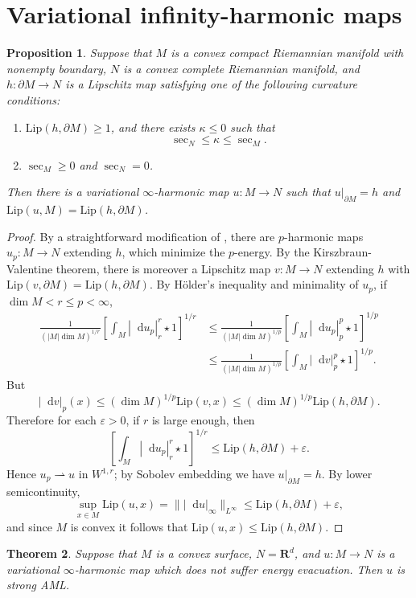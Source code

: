\documentclass[reqno,11pt]{amsart}
\newcommand{\RR}{\mathbf{R}}
\newcommand*\dif{\mathop{}\!\mathrm{d}}
\newcommand{\Lip}{\mathrm{Lip}}
\newtheorem{theorem}{Theorem}[section]
\newtheorem{proposition}[theorem]{Proposition}
\newcommand{\weakto}{\rightharpoonup}
\theoremstyle{definition}
\numberwithin{equation}{section}
\begin{document}
\section{Variational infinity-harmonic maps}
\begin{proposition}
Suppose that $M$ is a convex compact Riemannian manifold with nonempty boundary, $N$ is a convex complete Riemannian manifold, and $h: \partial M \to N$ is a Lipschitz map satisfying one of the following curvature conditions:
\begin{enumerate}
\item $\Lip(h, \partial M) \geq 1$, and there exists $\kappa \leq 0$ such that 
$$\sec_N \leq \kappa \leq \sec_M.$$
\item $\sec_M \geq 0$ and $\sec_N = 0$.
\end{enumerate}
Then there is a variational $\infty$-harmonic map $u: M \to N$ such that $u|_{\partial M} = h$ and $\Lip(u, M) = \Lip(h, \partial M)$.
\end{proposition}
\begin{proof}
By a straightforward modification of \cite[Theorem 2.12]{daskalopoulos2022analytic}, there are $p$-harmonic maps $u_p: M \to N$ extending $h$, which minimize the $p$-energy.
By the Kirszbraun-Valentine theorem, there is moreover a Lipschitz map $v: M \to N$ extending $h$ with $\Lip(v, \partial M) = \Lip(h, \partial M)$.
By H\"older's inequality and minimality of $u_p$, if $\dim M < r \leq p < \infty$,
\begin{align*}
\frac{1}{(|M| \dim M)^{1/r}} \left[\int_M |\dif u_p|_r^r \star 1\right]^{1/r}
&\leq \frac{1}{(|M| \dim M)^{1/p}} \left[\int_M |\dif u_p|_p^p \star 1\right]^{1/p} \\
&\leq \frac{1}{(|M| \dim M)^{1/p}} \left[\int_M |\dif v|_p^p \star 1\right]^{1/p}.
\end{align*}
But
$$|\dif v|_p(x) \leq (\dim M)^{1/p} \Lip(v, x) \leq (\dim M)^{1/p} \Lip(h, \partial M).$$
Therefore for each $\varepsilon > 0$, if $r$ is large enough, then
$$\left[\int_M |\dif u_p|_r^r \star 1\right]^{1/r} \leq \Lip(h, \partial M) + \varepsilon.$$
Hence $u_p \weakto u$ in $W^{1, r}$; by Sobolev embedding we have $u|_{\partial M} = h$.
By lower semicontinuity, 
$$\sup_{x \in M} \Lip(u, x) = \||\dif u|_\infty\|_{L^\infty} \leq \Lip(h, \partial M) + \varepsilon,$$
and since $M$ is convex it follows that $\Lip(u, x) \leq \Lip(h, \partial M)$.
\end{proof}

\begin{theorem}
Suppose that $M$ is a convex surface, $N = \RR^d$, and $u: M \to N$ is a variational $\infty$-harmonic map which does not suffer energy evacuation.
Then $u$ is strong AML. 
\end{theorem}
\end{document}
